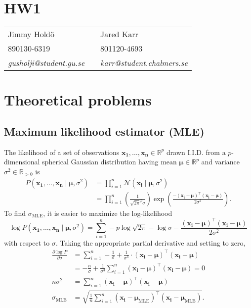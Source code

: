 \documentclass[a4paper,11pt]{article}
\DeclareMathOperator{\given}{\mid}
\begin{document}
	
	\section*{HW1}
	
	\begin{tabular*}{0.9\textwidth}{@{\extracolsep{\fill} } lll}
		Jimmy Hold\"{o} & & Jared Karr\\
		890130-6319 & & 801120-4693\\
		\it{gusholji@student.gu.se} & & \it{karr@student.chalmers.se}\\
	\end{tabular*}
	
	\section{Theoretical problems}
	\subsection{Maximum likelihood estimator (MLE)}
	The likelihood of a set of observations $\mathbf{x_1},\dots,\mathbf{x_n}\in\mathbb{R}^p$ drawn I.I.D. from a $p$-dimensional spherical Gaussian distribution having mean $\boldsymbol\mu\in\mathbb{R}^p$ and variance $\sigma^2\in\mathbb{R}_{>0}$ is
	\begin{align*}
	P(\mathbf{x_1},\dots,\mathbf{x_n}\given \boldsymbol\mu,\sigma^2)
	&=\prod_{i=1}^n\mathcal{N}(\mathbf{x_i}\given \boldsymbol\mu, \sigma^2)\\
	&=\prod_{i=1}^n\left(
	\frac{1}{\sqrt{2\pi}^p\sigma}
	\right)\exp\left(
	\frac{-(\mathbf{x_i}-\boldsymbol\mu)^\top(\mathbf{x_i}-\boldsymbol\mu)}
	{2\sigma^2}
	\right).
	\end{align*}
	To find $\sigma_\textrm{MLE}$, it is easier to maximize the log-likelihood
	\begin{equation*}
	\log P(\mathbf{x_1},\dots,\mathbf{x_n}\given\boldsymbol\mu,\sigma^2)
	=\sum_{i=1}^n
	-p\log\sqrt{2\pi}
	-\log\sigma
	-\frac{(\mathbf{x_i}-\boldsymbol\mu)^\top(\mathbf{x_i}-\boldsymbol\mu)}{2\sigma^2} 
	\end{equation*}
	with respect to $\sigma$. Taking the appropriate partial derivative and setting to zero,
	\begin{align*}
	\frac{\partial\log P}{\partial\sigma}
	&=\sum_{i=1}^n
	-\frac{1}{\sigma}
	+\frac{1}{\sigma^3}\cdot(\mathbf{x_i}-\boldsymbol\mu)^\top(\mathbf{x_i}-\boldsymbol\mu)\\
	&=-\frac{n}{\sigma}
	+\frac{1}{\sigma^3}\sum_{i=1}^n(\mathbf{x_i}-\boldsymbol\mu)^\top(\mathbf{x_i}-\boldsymbol\mu)=0\\
	n\sigma^2
	&=\sum_{i=1}^n(\mathbf{x_i}-\boldsymbol\mu)^\top(\mathbf{x_i}-\boldsymbol\mu)\\
	\sigma_\textrm{MLE}&=\sqrt{\frac{1}{n}\sum_{i=1}^n(\mathbf{x_i}-\boldsymbol\mu_\textrm{MLE})^\top(\mathbf{x_i}-\boldsymbol\mu_\textrm{MLE})}.
	\end{align*}
\end{document}
